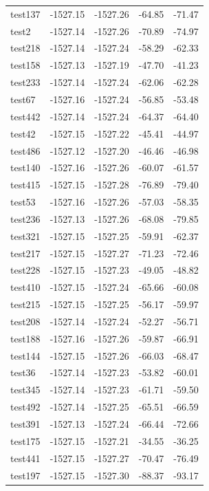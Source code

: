 \documentclass[journal=jacsat,manuscript=article]{achemso}
\begin{document}
\begin{table}[b!]
\begin{tabular}{lrrrr}
test137 &  -1527.15 &  -1527.26 &  -64.85 &  -71.47 \\
test2   &  -1527.14 &  -1527.26 &  -70.89 &  -74.97 \\
test218 &  -1527.14 &  -1527.24 &  -58.29 &  -62.33 \\
test158 &  -1527.13 &  -1527.19 &  -47.70 &  -41.23 \\
test233 &  -1527.14 &  -1527.24 &  -62.06 &  -62.28 \\
test67  &  -1527.16 &  -1527.24 &  -56.85 &  -53.48 \\
test442 &  -1527.14 &  -1527.24 &  -64.37 &  -64.40 \\
test42  &  -1527.15 &  -1527.22 &  -45.41 &  -44.97 \\
test486 &  -1527.12 &  -1527.20 &  -46.46 &  -46.98 \\
test140 &  -1527.16 &  -1527.26 &  -60.07 &  -61.57 \\
test415 &  -1527.15 &  -1527.28 &  -76.89 &  -79.40 \\
test53  &  -1527.16 &  -1527.26 &  -57.03 &  -58.35 \\
test236 &  -1527.13 &  -1527.26 &  -68.08 &  -79.85 \\
test321 &  -1527.15 &  -1527.25 &  -59.91 &  -62.37 \\
test217 &  -1527.15 &  -1527.27 &  -71.23 &  -72.46 \\
test228 &  -1527.15 &  -1527.23 &  -49.05 &  -48.82 \\
test410 &  -1527.15 &  -1527.24 &  -65.66 &  -60.08 \\
test215 &  -1527.15 &  -1527.25 &  -56.17 &  -59.97 \\
test208 &  -1527.14 &  -1527.24 &  -52.27 &  -56.71 \\
test188 &  -1527.16 &  -1527.26 &  -59.87 &  -66.91 \\
test144 &  -1527.15 &  -1527.26 &  -66.03 &  -68.47 \\
test36  &  -1527.14 &  -1527.23 &  -53.82 &  -60.01 \\
test345 &  -1527.14 &  -1527.23 &  -61.71 &  -59.50 \\
test492 &  -1527.14 &  -1527.25 &  -65.51 &  -66.59 \\
test391 &  -1527.13 &  -1527.24 &  -66.44 &  -72.66 \\
test175 &  -1527.15 &  -1527.21 &  -34.55 &  -36.25 \\
test441 &  -1527.15 &  -1527.27 &  -70.47 &  -76.49 \\
test197 &  -1527.15 &  -1527.30 &  -88.37 &  -93.17 \\

\end{tabular}
\end{table}
\end{document}
